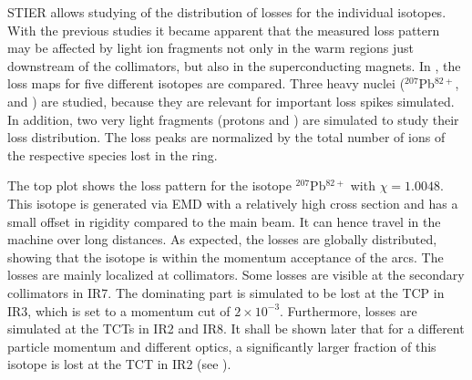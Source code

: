 






STIER allows studying of the distribution of losses for the individual isotopes. With the previous studies it became apparent that the measured loss pattern may be affected by light ion fragments not only in the warm regions just downstream of the collimators, but also in the superconducting magnets. In , the loss maps for five different isotopes are compared. Three heavy nuclei ($^{207}$Pb$^{82+}$,  and ) are studied, because they are relevant for important loss spikes simulated. In addition, two very light fragments (protons and ) are simulated to study their loss distribution. The loss peaks are normalized by the total number of ions of the respective species lost in the ring. 

The top plot shows the loss pattern for the isotope $^{207}$Pb$^{82+}$ with $\chi = 1.0048$. This isotope is generated via EMD with a relatively high cross section and has a small offset in rigidity compared to the main beam. It can hence travel in the machine over long distances. As expected, the losses are globally distributed, showing that the isotope is within the momentum acceptance of the arcs. The losses are mainly localized at collimators. Some losses are visible at the secondary collimators in IR7. The dominating part is simulated to be lost at the TCP in IR3, which is set to a momentum cut of $2\times 10^{-3}$. Furthermore, losses are simulated at the TCTs in IR2 and IR8. It shall be shown later that for a different particle momentum and different optics, a significantly larger fraction of this isotope is lost at the TCT in IR2 (see ). 

